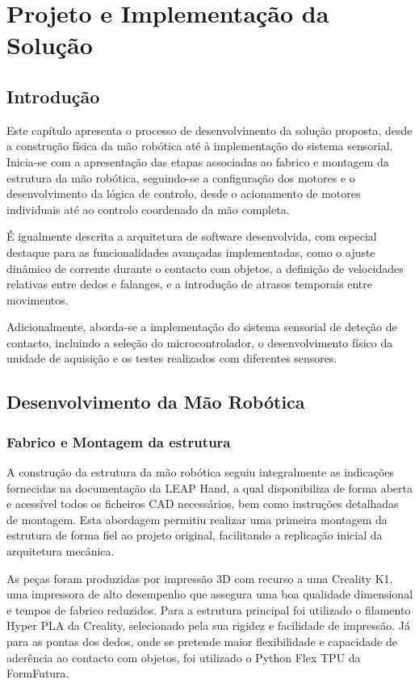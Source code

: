 \chapter{Projeto e Implementação da Solução}
\label{chapter:solução}

\section{Introdução}

Este capítulo apresenta o processo de desenvolvimento da solução proposta, desde a construção física da mão robótica até à implementação do sistema sensorial.  Inicia-se com a apresentação das etapas associadas ao fabrico e montagem da estrutura da mão robótica, seguindo-se a configuração dos motores e o desenvolvimento da lógica de controlo, desde o acionamento de motores individuais até ao controlo coordenado da mão completa.

É igualmente descrita a arquitetura de software desenvolvida, com especial destaque para as funcionalidades avançadas implementadas, como o ajuste dinâmico de corrente durante o contacto com objetos, a definição de velocidades relativas entre dedos e falanges, e a introdução de atrasos temporais entre movimentos.

Adicionalmente, aborda-se a implementação do sistema sensorial de deteção de contacto, incluindo a seleção do microcontrolador, o desenvolvimento físico da unidade de aquisição e os testes realizados com diferentes sensores. 

\section{Desenvolvimento da Mão Robótica}



\subsection{Fabrico e Montagem da estrutura}

A construção da estrutura da mão robótica seguiu integralmente as indicações fornecidas na documentação da LEAP Hand, a qual disponibiliza de forma aberta e acessível todos os ficheiros CAD necessários, bem como instruções detalhadas de montagem. Esta abordagem permitiu realizar uma primeira montagem da estrutura de forma fiel ao projeto original, facilitando a replicação inicial da arquitetura mecânica.

As peças foram produzidas por impressão 3D com recurso a uma Creality K1, uma impressora de alto desempenho que assegura uma boa qualidade dimensional e tempos de fabrico reduzidos. Para a estrutura principal foi utilizado o filamento Hyper PLA da Creality, selecionado pela sua rigidez e facilidade de impressão. Já para as pontas dos dedos, onde se pretende maior flexibilidade e capacidade de aderência ao contacto com objetos, foi utilizado o Python Flex TPU da FormFutura.

